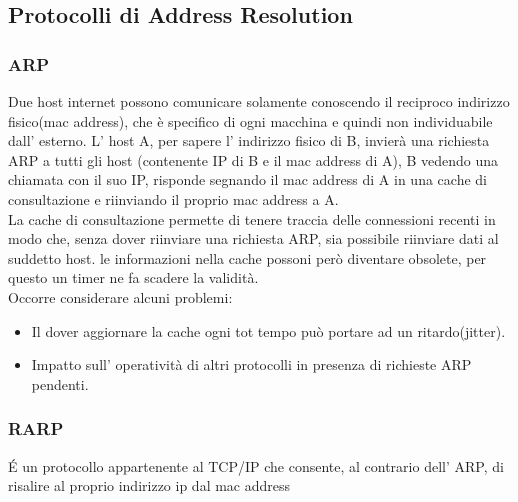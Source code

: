 \documentclass[a4paper,11pt]{article}
\def\subsub#1{\subsubsection{#1}\label{#1}}
\begin{document}
\subsection{Protocolli di Address Resolution} 
\subsub{ARP} %
Due host internet possono comunicare solamente conoscendo il reciproco indirizzo fisico(mac address), che è specifico di ogni macchina e quindi non individuabile dall' esterno.
L' host A, per sapere l' indirizzo fisico di B, invierà una richiesta ARP a tutti gli host (contenente IP di B e il mac address di A), B vedendo una chiamata con il suo IP, risponde segnando il mac address di A in una cache di consultazione e riinviando il proprio mac address a A.\\
La cache di consultazione permette di tenere traccia delle connessioni recenti in modo che, senza dover riinviare una richiesta ARP, sia possibile riinviare dati al suddetto host. le informazioni nella cache possoni però diventare obsolete, per questo un timer ne fa scadere la validità.\\
Occorre considerare alcuni problemi:\\
\begin {itemize}
\item Il dover aggiornare la cache ogni tot tempo può portare ad un ritardo(jitter).\\
\item Impatto sull' operatività di altri protocolli in presenza di richieste ARP pendenti.\\
\end{itemize}
\subsub{RARP} %
\'E un protocollo appartenente al TCP/IP che consente, al contrario dell' ARP, di risalire al proprio indirizzo ip dal mac address
\end{document}
